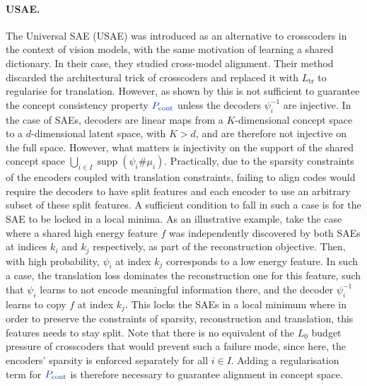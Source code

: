 \documentclass{article}
\begin{document}
\paragraph{USAE.} The Universal SAE (USAE) \citep{TODO:USAE} was introduced as an alternative to crosscoders in the context of vision models, with the same motivation of learning a shared dictionary. In their case, they studied cross-model alignment. Their method discarded the architectural trick of crosscoders and replaced it with $L_{\mathrm{tr}}$ to regularise for translation. However, as shown by \citet{TODO:rufin} this is not sufficient to guarantee the concept consistency property $\Pcont$ unless the decoders $\psi^{-1}_i$ are injective. In the case of SAEs, decoders are linear maps from a $K$-dimensional concept space to a $d$-dimensional latent space, with $K > d$, and are therefore not injective on the full space. However, what matters is injectivity on the support of the shared concept space $\bigcup_{i \in I} \operatorname{supp}(\psi_i \# \mu_i)$. Practically, due to the sparsity constraints of the encoders coupled with translation constraints, failing to align codes would require the decoders to have split features and each encoder to use an arbitrary subset of these split features. A sufficient condition to fall in such a case is for the SAE to be locked in a local minima.
As an illustrative example, take the case where a shared high energy feature $f$ was independently discovered by both SAEs at indices $k_i$ and $k_j$ respectively, as part of the reconstruction objective. Then, with high probability, $\psi_i$ at index $k_j$ corresponds to a low energy feature. In such a case, the translation loss dominates the reconstruction one for this feature, such that $\psi_i$ learns to not encode meaningful information there, and the decoder $\psi_i^{-1}$ learns to copy $f$ at index $k_j$. This locks the SAEs in a local minimum where in order to preserve the constraints of sparsity, reconstruction and translation, this features needs to stay split.
Note that there is no equivalent of the $L_0$ budget pressure of crosscoders that would prevent such a failure mode, since here, the encoders' sparsity is enforced separately for all $i \in I$. Adding a regularisation term for $\Pcont$ is therefore necessary to guarantee alignment in concept space.
\end{document}
